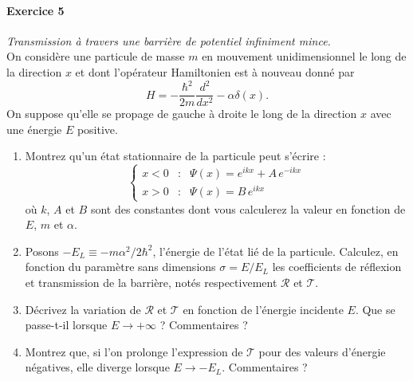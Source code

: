 \paragraph{Exercice 5} \textit{Transmission à travers une barrière de potentiel infiniment mince.} \\
On considère une particule de masse $m$ en mouvement unidimensionnel le long de la direction $x$ et dont l'opérateur Hamiltonien est à nouveau donné par
\begin{equation}
H = -\frac{\hbar^2}{2m} \frac{d^2}{dx^2} - \alpha \delta(x).
\end{equation}
On suppose qu'elle se propage de gauche à droite le long de la direction $x$ avec une énergie $E$ positive. 
\begin{enumerate}
\item Montrez qu'un état stationnaire de la particule peut s'écrire :
\begin{equation}
\left\lbrace
\begin{array}{ccl}
x<0 & : & \Psi(x) = e^{ikx} + A \, e^{-ikx} \\ 
x>0 & : & \Psi(x) = B \, e^{ikx}
\end{array} 
\right.
\end{equation}
où $k$, $A$ et $B$ sont des constantes dont vous calculerez la valeur en fonction de $E$, $m$ et $\alpha$. 
\item Posons $-E_L \equiv -m\alpha^2/2\hbar^2$, l'énergie de l'état lié de la particule. Calculez, en fonction du paramètre sans dimensions $\sigma = E/E_L$ les coefficients de réflexion et transmission de la barrière, notés respectivement $\mathcal{R}$ et $\mathcal{T}$.
\item Décrivez la variation de $\mathcal{R}$ et $\mathcal{T}$ en fonction de l'énergie incidente $E$. Que se passe-t-il lorsque $E\to+\infty$ ? Commentaires ?
\item Montrez que, si l'on prolonge l'expression de $\mathcal{T}$ pour des valeurs d'énergie négatives, elle diverge lorsque $E\to-E_L$. Commentaires ?
\end{enumerate}

\newpage
